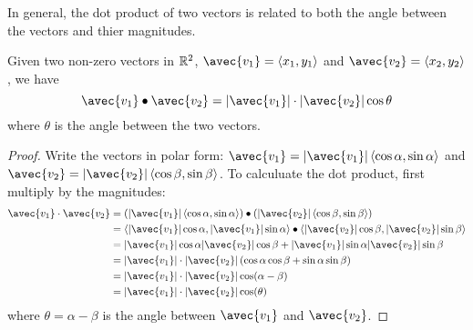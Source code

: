 \documentclass[handout]{ximera}
\begin{document}
\begin{image}
\end{image}

In general, the dot product of two vectors is related to both the angle between the vectors and thier magnitudes.

\begin{proposition}
Given two non-zero vectors in $\mathbb R^2$, $\avec{v_1} = \vector{x_1, y_1}$ and $\avec{v_2} = \vector{x_2, y_2}$, we have
\[
\avec{v_1} \dotp \avec{v_2} = |\avec{v_1}| \cdot |\avec{v_2}| \cos \theta
\]
where $\theta$ is the angle between the two vectors.
\begin{proof}
Write the vectors in polar form: $\avec{v_1} = |\avec{v_1}| \vector{\cos \alpha, \sin \alpha}$ and 
$\avec{v_2} = |\avec{v_2}| \vector{\cos \beta, \sin \beta}$. To calculuate the dot product, first multiply by the magnitudes:
\begin{align*}
\avec{v_1} \cdot \avec{v_2} & = \left(|\avec{v_1}| \vector{\cos \alpha, \sin \alpha}\right) \dotp \left( |\avec{v_2}| \vector{\cos \beta, \sin \beta} \right)\\
                            &= \vector{|\avec{v_1}|\cos \alpha, |\avec{v_1}|\sin \alpha} \dotp   \vector{|\avec{v_2}|\cos \beta, |\avec{v_2}|\sin \beta} \\
                            &= |\avec{v_1}| \cos \alpha |\avec{v_2}|\cos \beta + |\avec{v_1}|\sin \alpha |\avec{v_2}|\sin \beta\\
                            &= |\avec{v_1}|\cdot |\avec{v_2}| \left(\cos \alpha \cos \beta + \sin \alpha \sin \beta\right)\\
                            &= |\avec{v_1}| \cdot|\avec{v_2}| \cos(\alpha - \beta)\\
                            &= |\avec{v_1}| \cdot |\avec{v_2}| \cos(\theta)
\end{align*}
where $\theta = \alpha - \beta$ is the angle between $\avec{v_1}$ and $\avec{v_2}$.
\end{proof}
\end{proposition}
\end{document}
